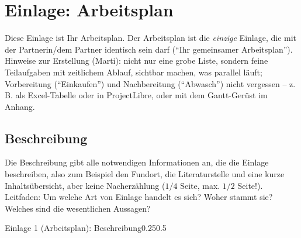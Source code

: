 \section{Einlage: Arbeitsplan}
\label{sec:arbeitsplan}

\begin{hinweise}
Diese Einlage ist Ihr Arbeitsplan. Der Arbeitsplan ist die \emph{einzige} Einlage, die mit der Partnerin/dem
Partner identisch sein darf (\enquote{Ihr gemeinsamer Arbeitsplan}). Hinweise zur Erstellung (Marti): nicht nur
eine grobe Liste, sondern feine Teilaufgaben mit zeitlichem Ablauf, sichtbar machen, was parallel läuft;
Vorbereitung (\enquote{Einkaufen}) und Nachbereitung (\enquote{Abwasch}) nicht vergessen -- z.\,B. als
Excel-Tabelle oder in ProjectLibre, oder mit dem Gantt-Gerüst im Anhang.
\end{hinweise}

\subsection{Beschreibung}
\begin{hinweise}
Die Beschreibung gibt alle notwendigen Informationen an, die die Einlage beschreiben, also zum Beispiel den
Fundort, die Literaturstelle und eine kurze Inhaltsübersicht, aber keine Nacherzählung ($1/4$ Seite, max.
$1/2$ Seite!). Leitfaden: Um welche Art von Einlage handelt es sich? Woher stammt sie? Welches sind die
wesentlichen Aussagen?
\end{hinweise}
\begin{umfang}{Einlage 1 (Arbeitsplan): Beschreibung}{0.25}{0.5}
\end{umfang}

